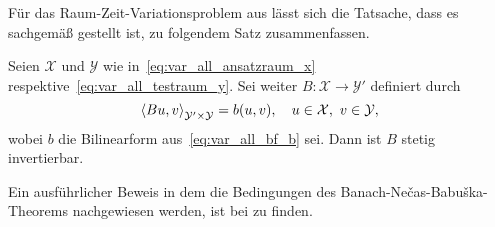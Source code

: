 Für das Raum-Zeit-Variationsproblem aus  lässt sich die Tatsache, dass es sachgemäß gestellt ist, zu folgendem Satz zusammenfassen.

\begin{Satz}
\label{thm:schwab09:theorem51}
    Seien $\mathcal X$ und $\mathcal Y$ wie in~\eqref{eq:var_all_ansatzraum_x} respektive~\eqref{eq:var_all_testraum_y}.
    Sei weiter $B \colon \mathcal X \to \mathcal Y'$ definiert durch
    \begin{equation}
        \label{eq:var_all_gross_b}
        \left\langle B u,v\right\rangle_{\mathcal Y' \times \mathcal Y} = b(u, v), \quad u \in \mathcal X,~v \in \mathcal Y,
    \end{equation}
    wobei $b$ die Bilinearform aus~\eqref{eq:var_all_bf_b} sei.
    Dann ist $B$ stetig invertierbar.

    \begin{Beweis}
        Ein ausführlicher Beweis in dem die Bedingungen des Banach-Ne\v{c}as-Babu\v{s}ka-Theorems nachgewiesen werden, ist bei \textcite[Appendix A]{Schwab:2009ec} zu finden.



\end{Beweis}
\end{Satz}
